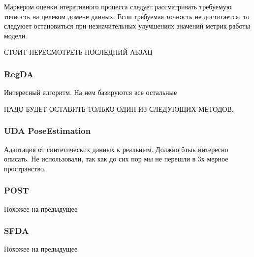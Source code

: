 Маркером оценки итеративного процесса следует рассматривать требуемую точность на целевом домене данных. Если требуемая точность не достигается, то следуюет остановиться при незначительных улучшениях значений метрик работы модели.

СТОИТ ПЕРЕСМОТРЕТЬ ПОСЛЕДНИЙ АБЗАЦ

\subsubsection*{RegDA}

Интересный алгоритм. На нем базируются все остальные

\hfill \break

НАДО БУДЕТ ОСТАВИТЬ ТОЛЬКО ОДИН ИЗ СЛЕДУЮЩИХ МЕТОДОВ.

\subsubsection*{UDA PoseEstimation}

Адаптация от синтетических данных к реальным. Должно бтыь интересно описать. Не использовали, так как до сих пор мы не перешли в 3х мерное пространство.

\subsubsection*{POST}

Похожее на предыдущее

\subsubsection*{SFDA}

Похожее на предыдущее


\newpage
